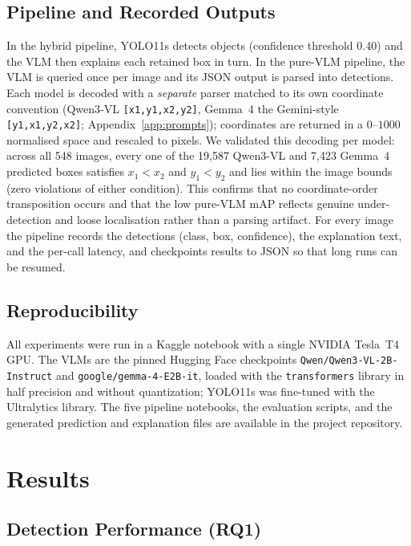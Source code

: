 \documentclass[acmtog, authorversion]{acmart}
\begin{document}
\subsection{Pipeline and Recorded Outputs}
In the hybrid pipeline, YOLO11s detects objects (confidence threshold
0.40) and the VLM then explains each retained box in turn. In the
pure-VLM pipeline, the VLM is queried once per image and its JSON
output is parsed into detections. Each model is decoded with a
\emph{separate} parser matched to its own coordinate convention
(Qwen3-VL \texttt{[x1,y1,x2,y2]}, Gemma~4 the Gemini-style
\texttt{[y1,x1,y2,x2]}; Appendix~\ref{app:prompts}); coordinates are
returned in a $0$--$1000$ normalised space and rescaled to pixels. We
validated this decoding per model: across all 548 images, every one of
the 19{,}587 Qwen3-VL and 7{,}423 Gemma~4 predicted boxes satisfies
$x_1 < x_2$ and $y_1 < y_2$ and lies within the image bounds (zero
violations of either condition). This confirms that no coordinate-order
transposition occurs and that the low pure-VLM mAP reflects genuine
under-detection and loose localisation rather than a parsing artifact.
For every image
the pipeline records the detections (class, box, confidence), the
explanation text, and the per-call latency, and checkpoints results to
JSON so that long runs can be resumed.

\subsection{Reproducibility}
All experiments were run in a Kaggle notebook with a single NVIDIA
Tesla~T4 GPU. The VLMs are the pinned Hugging Face checkpoints
\texttt{Qwen/Qwen3-VL-2B-Instruct} and \texttt{google/gemma-4-E2B-it},
loaded with the \texttt{transformers} library in half precision and
without quantization; YOLO11s was fine-tuned with the Ultralytics
library. The five pipeline notebooks, the evaluation scripts, and the
generated prediction and explanation files are available in the project
repository.

\section{Results}
\label{sec:results}

\subsection{Detection Performance (RQ1)}
\end{document}
